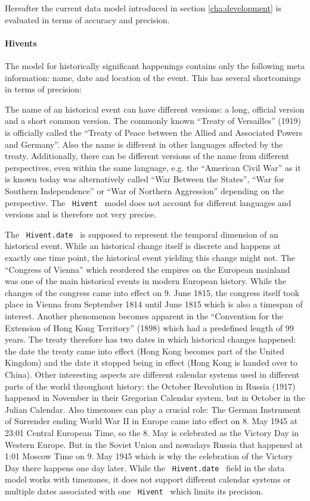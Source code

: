Hereafter the current data model introduced in section \ref{cha:development}
is evaluated in terms of accuracy and precision.


\paragraph{Hivents} %
\label{par:evaluation_hivents}

The model for historically significant happenings contains only the following meta information: name, date and location of the event. This has several shortcomings in terms of precision:

The name of an historical event can have different versions: a long, official version and a short common version. The commonly known ``Treaty of Versailles'' (1919) is officially called the ``Treaty of Peace between the Allied and Associated Powers and Germany''. Also the name is different in other languages affected by the treaty. Additionally, there can be different versions of the name from different perspectives, even within the same language, e.g. the ``American Civil War'' as it is known today was alternatively called ``War Between the States'', ``War for Southern Independence'' or ``War of Northern Aggression'' depending on the perspective.
The ~\texttt{Hivent}~ model does not account for different languages and versions and is therefore not very precise.

The ~\texttt{Hivent.date}~ is supposed to represent the temporal dimension of an historical event. While an historical change itself is discrete and happens at exactly one time point, the historical event yielding this change might not. The ``Congress of Vienna'' which reordered the empires on the European mainland was one of the main historical events in modern European history. While the changes of the congress came into effect on 9. June 1815, the congress itself took place in Vienna from September 1814 until June 1815 which is also a timespan of interest. Another phenomenon becomes apparent in the ``Convention for the Extension of Hong Kong Territory'' (1898) which had a predefined length of 99 years. The treaty therefore has two dates in which historical changes happened: the date the treaty came into effect (Hong Kong becomes part of the United Kingdom) and the date it stopped being in effect (Hong Kong is handed over to China). Other interesting aspects are different calendar systems used in different parts of the world throughout history: the October Revolution in Russia (1917) happened in November in their Gregorian Calendar system, but in October in the Julian Calendar. Also timezones can play a crucial role: The German Instrument of Surrender ending World War II in Europe came into effect on 8. May 1945 at 23:01 Central European Time, so the 8. May is celebrated as the Victory Day in Western Europe. But in the Soviet Union and nowadays Russia that happened at 1:01 Moscow Time on 9. May 1945 which is why the celebration of the Victory Day there happens one day later. While the ~\texttt{Hivent.date}~ field in the data model works with timezones, it does not support different calendar systems or multiple dates associated with one ~\texttt{Hivent}~ which limits its precision.

